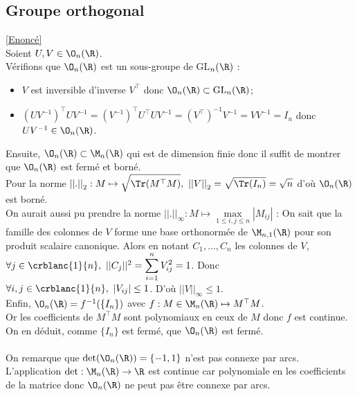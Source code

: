 \documentclass{book}
\begin{document}
	\subsection{Groupe orthogonal }
	\label{sec:groupe-orthogonal-etoile1}
	\textcolor{blue}{\hyperref[Groupe orthogonal]{[Enoncé]}}\\
	Soient $U,V\in \O_n(\R)$.\\
	Vérifions que $\O_n(\R)$ est un sous-groupe de GL$_n(\R)$ :
	\begin{itemize}
		\item $V$ est inversible d'inverse $V^\top$ donc $\O_n(\R)\subset \text{GL}_n(\R)$;
		\item $(UV^{-1})^\top UV^{-1}=(V^{-1})^\top U^\top UV^{-1}=(V^\top)^{-1}V^{-1}=VV^{-1}=I_n$ donc $UV^{-1}\in \O_n(\R)$.
	\end{itemize}
	Ensuite, $\O_n(\R)\subset \M_n(\R)$ qui est de dimension finie donc il suffit de montrer que $\O_n(\R)$ est fermé et borné.\\
	Pour la norme ${||.||}_2:M\mapsto \displaystyle\sqrt{\Tr(M^\top M)},\ {||V||}_2=\displaystyle\sqrt{\Tr(I_n)}=\displaystyle\sqrt{n}$ d'où $\O_n(\R)$ est borné.\\
	On aurait aussi pu prendre la norme ${||.||}_\infty:M\mapsto \max\limits_{1\leq i,j\leq n}|M_{ij}|$ : On sait que la famille des colonnes de $V$ forme une base orthonormée de $\M_{n,1}(\R)$ pour son produit scalaire canonique. Alors en notant $C_1,\dots,C_n$ les colonnes de $V$,\\
	$\forall j\in \crblanc{1}{n},\ ||C_j||^2=\displaystyle\sum\limits_{i=1}^nV_{ij}^2=1$. Donc $\forall i,j\in\crblanc{1}{n},\ |V_{ij}|\leq 1$. D'où ${||V||}_\infty\leq 1$.\\
	Enfin, $\O_n(\R)=f^{-1}(\{I_n\})$ avec $f:M\in \M_n(\R)\mapsto M^\top M$.\\
	Or les coefficients de $M^\top M$ sont polynomiaux en ceux de $M$ donc $f$ est continue.\\
	On en déduit, comme $\{I_n\}$ est fermé, que $\O_n(\R)$ est fermé.\\\\
	On remarque que $\det(\O_n(\R))=\{-1,1\}$ n'est pas connexe par arcs.\\
	L'application $\det:\M_n(\R)\to \R$ est continue car polynomiale en les coefficients de la matrice donc $\O_n(\R)$ ne peut pas être connexe par arcs.
	
\end{document}

